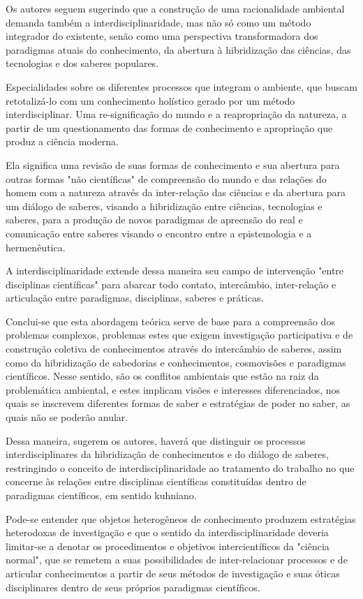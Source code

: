 \documentclass[
   article,       %
   12pt,          %
   oneside,       %
   a4paper,       %
   english,       %
   brazil,           %
   sumario=tradicional
   ]{abntex2}
\begin{document}
Os autores seguem sugerindo que a construção de uma racionalidade ambiental demanda também a interdisciplinaridade, mas não só como um método integrador do existente, senão como uma perspectiva transformadora dos paradigmas atuais do conhecimento, da abertura à hibridização das ciências, das tecnologias e dos saberes populares. 

Especialidades sobre os diferentes processos que integram o ambiente, que buscam retotalizá-lo com um conhecimento holístico gerado por um método interdisciplinar. Uma re-significação do mundo e a reapropriação da natureza, a partir de um questionamento das formas de conhecimento e apropriação que produz a ciência moderna. 

Ela significa uma revisão de suas formas de conhecimento e sua abertura para outras formas "não científicas" de compreensão do mundo e das relações do homem com a natureza através da inter-relação das ciências e da abertura para um diálogo de saberes, visando a hibridização entre ciências, tecnologias e saberes, para a produção de novos paradigmas de apreensão do real e comunicação entre saberes visando o encontro entre a epistemologia e a hermenêutica. 

A interdisciplinaridade extende dessa maneira seu campo de intervenção "entre disciplinas científicas" para abarcar todo contato, intercâmbio, inter-relação e articulação entre paradigmas, disciplinas, saberes e práticas. 

Conclui-se que esta abordagem teórica serve de base para a compreensão dos problemas complexos, problemas estes que exigem investigação participativa e de construção coletiva de conhecimentos através do intercâmbio de saberes, assim como da hibridização de sabedorias e conhecimentos, cosmovisões e paradigmas científicos. Nesse sentido, são os conflitos ambientais que estão na raiz da problemática ambiental, e estes implicam visões e interesses diferenciados, nos quais se inscrevem diferentes formas de saber e estratégias de poder no saber, as quais não se poderão anular.

Dessa maneira, sugerem os autores, haverá que distinguir os processos interdisciplinares da hibridização de conhecimentos e do diálogo de saberes, restringindo o conceito de interdisciplinaridade ao tratamento do trabalho no que concerne às relações entre disciplinas científicas constituídas dentro de paradigmas científicos, em sentido kuhniano.

Pode-se entender que objetos heterogêneos de conhecimento produzem estratégias heterodoxas de investigação e que o sentido da interdisciplinaridade deveria limitar-se a denotar os procedimentos e objetivos intercientíficos da "ciência normal", que se remetem a suas possibilidades de inter-relacionar processos e de articular conhecimentos a partir de seus métodos de investigação e suas óticas disciplinares dentro de seus próprios paradigmas científicos. 
\end{document}
